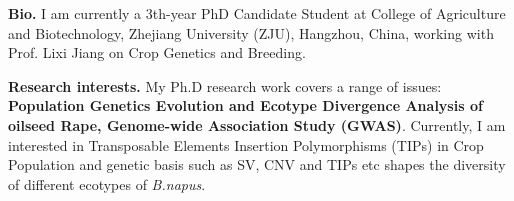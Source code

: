 %
%

\par{
{\textbf{Bio.}} 
I am currently a 3th-year PhD Candidate Student at College of Agriculture and Biotechnology, Zhejiang University (ZJU), Hangzhou, China, 
 working with Prof. Lixi Jiang on Crop Genetics and Breeding. 

{\textbf{Research interests.}} 
My Ph.D research work covers a range of issues: \textbf{Population Genetics Evolution and Ecotype Divergence Analysis of oilseed Rape, 
Genome-wide Association Study (GWAS)}. Currently, I am interested in Transposable Elements Insertion Polymorphisms (TIPs) in Crop Population and genetic basis such as SV, CNV and TIPs etc shapes the diversity of different ecotypes of \emph{B.napus}.  
}